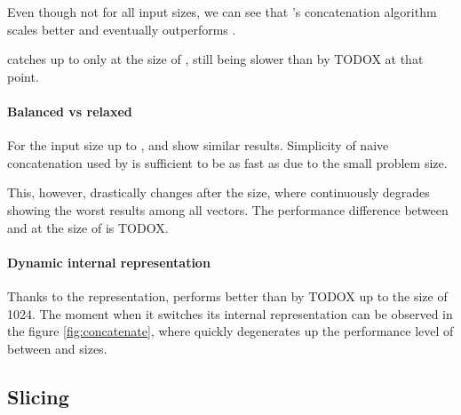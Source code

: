 Even though not for all input sizes, we can see that \rrbvec{}'s concatenation algorithm scales better and eventually outperforms \stdvec{}. 

\imrsvec{} catches up to \stdvec{} only at the size of , still being slower than \rrbvec{} by TODOX at that point. 

\paragraph{Balanced vs relaxed}
For the input size up to , \rbvec{} and \rrbvec{} show similar results. Simplicity of naive concatenation used by \rbvec{} is sufficient to be as fast as \rrbvec{} due to the small problem size. 

This, however, drastically changes after the  size, where \rbvec{} continuously degrades showing the worst results among all vectors. The performance difference between \rbvec{} and \rrbvec{} at the size of  is TODOX. 

\paragraph{Dynamic internal representation}
Thanks to the \stdvec{} representation, \pvec{} performs better than \rrbvec{} by TODOX up to the size of 1024. The moment when it switches its internal representation can be observed in the figure \ref{fig:concatenate}, where \pvec{} quickly degenerates up the performance level of \rrbvec{} between  and  sizes. 


\subsection{Slicing}


